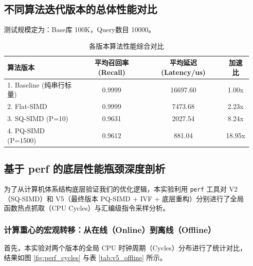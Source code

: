 \documentclass[UTF8,a4paper,10pt]{ctexart}
\begin{document}
\subsection{不同算法迭代版本的总体性能对比}
测试规模定为：Base库 100K，Query数目 10000。
\begin{table}[H]
    \centering
    \caption{各版本算法性能综合对比}
    \begin{tabular}{lccc}
    \toprule
    算法版本 & 平均召回率 (Recall) & 平均延迟 (Latency/us) & 加速比 \\
    \midrule
    1. Baseline (纯串行标量) & 0.9999 & 16697.60 & 1.00x \\
    2. Flat-SIMD & 0.9999 & 7473.68 & 2.23x \\
    3. SQ-SIMD (P=10) & 0.9631 & 2027.54 & 8.24x \\
    4. PQ-SIMD (P=1500) & 0.9612 & 881.04 & 18.95x \\
    \bottomrule
    \end{tabular}
\end{table}

\subsection{基于 perf 的底层性能瓶颈深度剖析}

为了从计算机体系结构底层验证我们的优化逻辑，本实验利用 \texttt{perf} 工具对 V2（SQ-SIMD）和 V5（最终版本 PQ-SIMD + IVF + 底层重构）分别进行了全局函数热点抓取（CPU Cycles）与汇编级指令采样分析。

\subsubsection{计算重心的宏观转移：从在线（Online）到离线（Offline）}

首先，本实验对两个版本的全局 CPU 时钟周期（Cycles）分布进行了统计对比，结果如图 \ref{fig:perf_cycles} 与表 \ref{tab:v5_offline} 所示。
\end{document}
